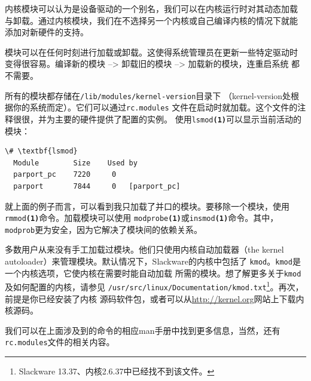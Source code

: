内核模块可以认为是设备驱动的一个别名，我们可以在内核运行时对其动态加载
与卸载。通过内核模块，我们在不选择另一个内核或自己编译内核的情况下就能
添加对新硬件的支持。

模块可以在任何时刻进行加载或卸载。这使得系统管理员在更新一些特定驱动时
变得很容易。编译新的模块 --> 卸载旧的模块 --> 加载新的模块，连重启系统
都不需要。

所有的模块都存储在\texttt{/lib/modules/kernel-version}目录下
（kernel-version处根据你的系统而定）。它们可以通过\texttt{rc.modules}
文件在启动时就加载。这个文件的注释很很，并为主要的硬件提供了配置的实例。
使用\texttt{lsmod\textbf{(1)}}可以显示当前活动的模块：
\begin{Verbatim}[frame=single, commandchars=\\\{\}]
  \# \textbf{lsmod}
  Module        Size    Used by
  parport_pc    7220     0
  parport       7844     0   [parport_pc]
\end{Verbatim}
就上面的例子而言，可以看到我只加载了并口的模块。要移除一个模块，使用
\texttt{rmmod\textbf{(1)}}命令。加载模块可以使用
\texttt{modprobe\textbf{(1)}}或\texttt{insmod\textbf{(1)}}命令。其中，
\texttt{modprob}更为安全，因为它解决了模块间的依赖关系。

多数用户从来没有手工加载过模块。他们只使用内核自动加载器（the kernel
autoloader）来管理模块。默认情况下，Slackware的内核中包括了
\texttt{kmod}。\texttt{kmod}是一个内核选项，它使内核在需要时能自动加载
所需的模块。想了解更多关于\texttt{kmod}及如何配置的内核，请参见
\texttt{/usr/src/linux/Documentation/kmod.txt}\footnote{Slackware
  13.37、内核2.6.37中已经找不到该文件。}。再次，前提是你已经安装了内核
源码软件包，或者可以从\url{http://kernel.org}网站上下载内核源码。

我们可以在上面涉及到的命令的相应man手册中找到更多信息，当然，还有
\texttt{rc.modules}文件的相关内容。







